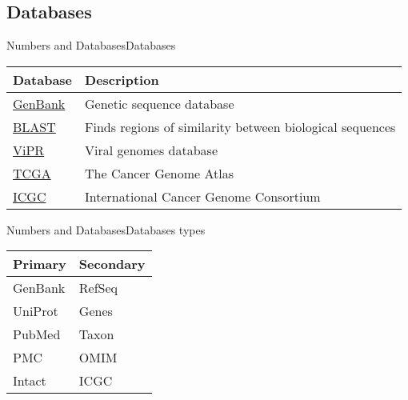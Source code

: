 \documentclass[10pt]{beamer}
\newcommand{\1}{
	\setbeamertemplate{background}{
		\texttt{[image: img/1]}
		\tikz[overlay] \fill[fill opacity=0.75,fill=white] (0,0) rectangle (-\paperwidth,\paperheight);
	}
}
\begin{document}
\subsection{Databases}

\begin{frame}{Numbers and Databases}{Databases}

\begin{tabular}{ll}
\textbf{Database} & \textbf{Description}                                                \\
\hline
\href{https://www.ncbi.nlm.nih.gov/genbank/}{GenBank}   & Genetic sequence database                                       \\
\href{https://blast.ncbi.nlm.nih.gov/Blast.cgi}{BLAST}    & Finds regions of similarity between biological sequences    \\
\href{https://www.viprbrc.org/}{ViPR}     & Viral genomes database                                                       \\
\href{https://www.cancer.gov/}{TCGA}     & The Cancer Genome Atlas                                                       \\
 \href{https://dcc.icgc.org/}{ICGC}     & International Cancer Genome Consortium                        \\      
\end{tabular}

\end{frame}


\begin{frame}{Numbers and Databases}{Databases types}
\centering
\begin{tabular}{ll}
\textbf{Primary} & \textbf{Secondary}                                \\
\hline
GenBank    & RefSeq    \\
UniProt    & Genes  \\
PubMed    & Taxon  \\
PMC    & OMIM  \\
Intact & ICGC \\
\end{tabular}

\end{frame}
\end{document}
